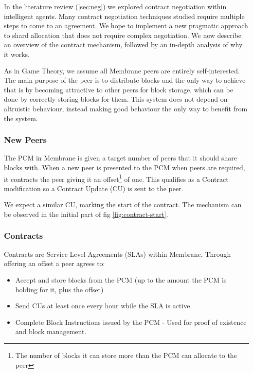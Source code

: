 \documentclass[11pt, a4paper, twocolumn, twoside]{report}
\begin{document}
In the literature review (\ref{sec:neg}) we explored contract negotiation within intelligent agents. Many contract negotiation techniques studied require multiple steps to come to an agreement. We hope to implement a new pragmatic approach to shard allocation that does not require complex negotiation. We now describe an overview of the contract mechanism, followed by an in-depth analysis of why it works.

As in Game Theory, we assume all Membrane peers are entirely self-interested. The main purpose of the peer is to distribute blocks and the only way to achieve that is by becoming attractive to other peers for block storage, which can be done by correctly storing blocks for them. This system does not depend on altruistic behaviour, instead making good behaviour the only way to benefit from the system.

\subsubsection{New Peers}

The PCM in Membrane is given a target number of peers that it should share blocks with. When a new peer is presented to the PCM when peers are required, it contracts the peer giving it an offset\footnote{The number of blocks it can store more than the PCM can allocate to the peer} of one. This qualifies as a Contract modification so a Contract Update (CU) is sent to the peer.

We expect a similar CU, marking the start of the contract. The mechanism can be observed in the initial part of fig \ref{fig:contract-start}.

\subsubsection{Contracts}

Contracts are Service Level Agreements (SLAs) within Membrane. Through offering an offset a peer agrees to:

\begin{itemize}
 \item Accept and store blocks from the PCM (up to the amount the PCM is holding for it, plus the offset)
 \item Send CUs at least once every hour while the SLA is active.
 \item Complete Block Instructions issued by the PCM - Used for proof of existence and block management.
\end{itemize}
\end{document}

